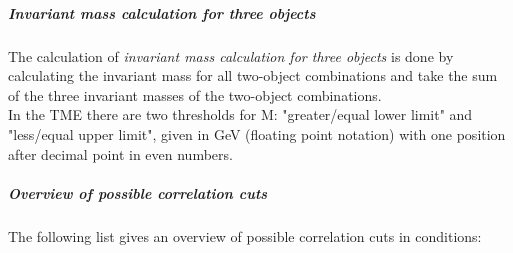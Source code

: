 \subparagraph{Invariant mass calculation for three objects}
\label{sec:gtl:inv_mass_3_obj_calculation}

The calculation of \textit{invariant mass calculation for three objects} is done by calculating the invariant mass for all two-object combinations and take the sum of the three invariant masses of the two-object combinations.\\
In the TME there are two thresholds for M: "greater/equal lower limit" and "less/equal upper limit", given in GeV (floating point notation) with one position after decimal point in even numbers.

\subparagraph{Overview of possible correlation cuts}
\label{sec:gtl:overview_correlation_cuts}

The following list gives an overview of possible correlation cuts in conditions:


